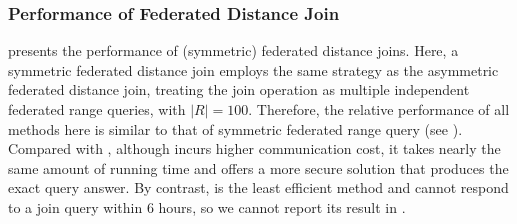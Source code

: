 \subsubsection{Performance of Federated Distance Join}
\label{sec:exp-symm-djoin}

 presents the performance of (symmetric) federated distance joins. 
Here, a symmetric federated distance join employs the same strategy as the asymmetric federated distance join, treating the join operation as multiple independent federated range queries, with $|R|=100$. Therefore, the relative performance of all methods here is similar to that of symmetric federated range query (see ). 
Compared with \ICDE, although \sysname incurs higher communication cost, it takes nearly the same amount of running time and offers a more secure solution that produces the exact query answer. 
By contrast, \EDBT is the least efficient method and cannot respond to a join query within 6 hours, so we cannot report its result in .

